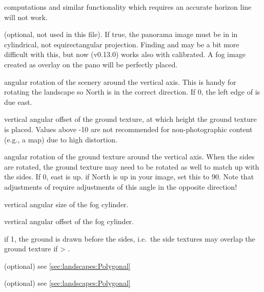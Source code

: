 \begin{description}
  computations and similar functionality which requires an accurate
  horizon line will not work.
\item[\var{tan\_mode}] (optional, not used in this file). If true, the
  panorama image must be in in cylindrical, not equirectangular
  projection. Finding  and
   may be a bit more difficult with this, but
  now (v0.13.0) works also with calibrated. A fog image created as
  overlay on the pano will be perfectly placed.
\item[\var{decor\_angle\_rotatez}] angular rotation of the scenery
  around the vertical axis. This is handy for rotating the landscape
  so North is in the correct direction. If 0, the left edge of
   is due east.
\item[\var{ground\_angle\_shift}] vertical angular offset of the
  ground texture, at which height the ground texture is placed. Values
  above -10 are not recommended for non-photographic content (e.g., a
  map) due to high distortion.
\item[\var{ground\_angle\_rotatez}] angular rotation of the ground
  texture around the vertical axis. When the sides are rotated, the
  ground texture may need to be rotated as well to match up with the
  sides. If 0, east is up. if North is up in your image, set this to
  90. Note that adjustments of  require
  adjustments of this angle in the opposite direction!
\item[\var{fog\_alt\_angle}] vertical angular size of the fog cylinder.
\item[\var{fog\_angle\_shift}] vertical angular offset of the fog cylinder.
\item[\var{draw\_ground\_first}] if 1, the ground is drawn before the
  sides, i.e.\ the side textures may overlap the ground texture if
   > .
\item[\var{polygonal\_horizon\_list}] (optional) see \ref{sec:landscapes:Polygonal} %
\item[\var{polygonal\_horizon\_list\_mode}] (optional) see \ref{sec:landscapes:Polygonal}  %

\end{description}
